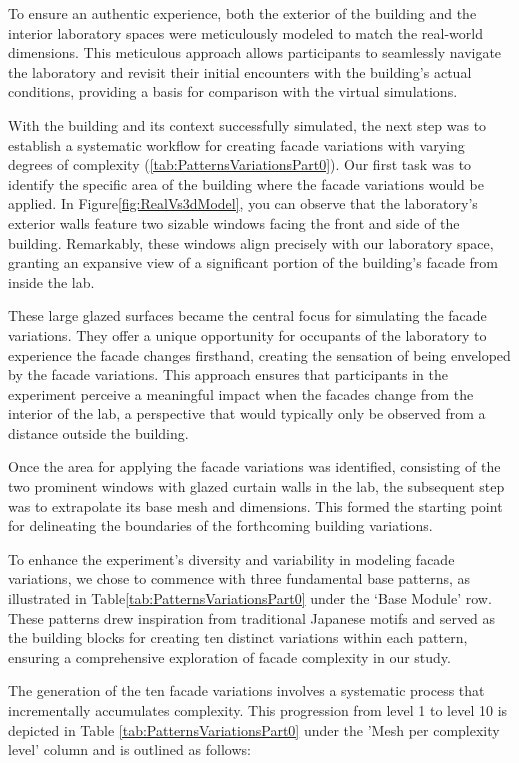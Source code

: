 To ensure an authentic experience, both the exterior of the building and the interior laboratory spaces were meticulously modeled to match the real-world dimensions.
This meticulous approach allows participants to seamlessly navigate the laboratory and revisit their initial encounters with the building's actual conditions, providing a basis for comparison with the virtual simulations.

With the building and its context successfully simulated, the next step was to establish a systematic workflow for creating facade variations with varying degrees of complexity (\ref{tab:PatternsVariationsPart0}).
Our first task was to identify the specific area of the building where the facade variations would be applied.
In Figure\ref{fig:RealVs3dModel}, you can observe that the laboratory's exterior walls feature two sizable windows facing the front and side of the building.
Remarkably, these windows align precisely with our laboratory space, granting an expansive view of a significant portion of the building's facade from inside the lab.

These large glazed surfaces became the central focus for simulating the facade variations.
They offer a unique opportunity for occupants of the laboratory to experience the facade changes firsthand, creating the sensation of being enveloped by the facade variations.
This approach ensures that participants in the experiment perceive a meaningful impact when the facades change from the interior of the lab, a perspective that would typically only be observed from a distance outside the building.

Once the area for applying the facade variations was identified, consisting of the two prominent windows with glazed curtain walls in the lab, the subsequent step was to extrapolate its base mesh and dimensions.
This formed the starting point for delineating the boundaries of the forthcoming building variations.

To enhance the experiment's diversity and variability in modeling facade variations, we chose to commence with three fundamental base patterns, as illustrated in Table\ref{tab:PatternsVariationsPart0} under the `Base Module' row.
These patterns drew inspiration from traditional Japanese motifs and served as the building blocks for creating ten distinct variations within each pattern, ensuring a comprehensive exploration of facade complexity in our study.

The generation of the ten facade variations involves a systematic process that incrementally accumulates complexity.
This progression from level 1 to level 10 is depicted in Table \ref{tab:PatternsVariationsPart0} under the 'Mesh per complexity level' column and is outlined as follows:

